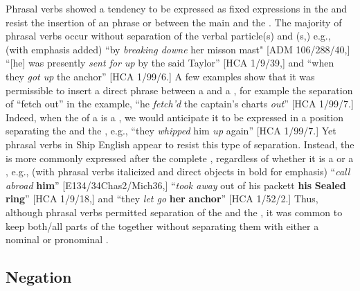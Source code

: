   Phrasal verbs showed a tendency to be expressed as fixed expressions in the  and resist the insertion of an  phrase or  between the main  and the . The majority of phrasal verbs occur without separation of the verbal particle(s) and (s,) e.g., (with emphasis added) “by \textit{breaking downe} her misson mast" [ADM 106/288/40,] “[he] was presently \textit{sent for up} by the said Taylor” [HCA 1/9/39,] and “when they \textit{got up} the anchor” [HCA 1/99/6.] A few examples show that it was permissible to insert a direct  phrase between a  and a , for example the separation of “fetch out” in the example, “he \textit{fetch’d} the captain’s charts \textit{out}” [HCA 1/99/7.] Indeed, when the  of a   is a , we would anticipate it to be expressed in a position separating the  and the , e.g., “they \textit{whipped} him \textit{up} again” [HCA 1/99/7.] Yet phrasal verbs in Ship English appear to resist this type of separation. Instead, the  is more commonly expressed after the complete , regardless of whether it is a  or a , e.g., (with phrasal verbs italicized and direct objects in bold for emphasis) “\textit{call abroad} \textbf{him}” [E134/34Chas2/Mich36,] “\textit{took away} out of his packett \textbf{his} \textbf{Sealed} \textbf{ring}” [HCA 1/9/18,] and “they \textit{let go} \textbf{her} \textbf{anchor}” [HCA 1/52/2.] Thus, although phrasal verbs permitted separation of the  and the , it was common to keep both/all parts of the  together without separating them with either a nominal or pronominal . 

\subsection{{Negation}}%

